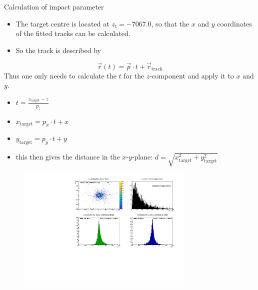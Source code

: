 \begin{frame}[t]{Calculation of impact parameter}
  \begin{itemize}
    \item The target centre is located at $z_t=-7067.0$, so that the $x$ and $y$ coordinates of the fitted tracks can be calculated.
    \item So the track is described by
  \end{itemize}
  \begin{equation}
    \vec{r}(t)=\vec{p}\cdot t+\vec{r}_\text{track}
  \end{equation}
  Thus one only needs to calculate the $t$ for the $z$-component and apply it to $x$ and $y$.
  \begin{itemize}
    \item $t = \frac{z_\text{target}-z}{p_z}$
    \item $x_\text{target} = p_x\cdot t + x$
    \item $y_\text{target} = p_y\cdot t + y$
    \item this then gives the distance in the $x$-$y$-plane: $d = \sqrt{x_\text{target}^2+y_\text{target}^2}$
  \end{itemize}
\end{frame}

\begin{frame}[t]{}
  \begin{figure}
    \centering
    \includegraphics[width=0.75\textwidth]{../hists/nofield/old/target_dist.pdf}
  \end{figure}
\end{frame}


